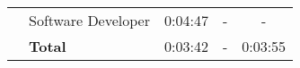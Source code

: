 \begin{table}[tb]
\begin{tabular}{llrrr}
                            & Software Developer   & 0:04:47                                                           & \multicolumn{1}{c}{-}                                                   & \multicolumn{1}{c}{-}                                         \\
                            & \textbf{Total}       & 0:03:42                                                           & \multicolumn{1}{c}{-}                                                   & 0:03:55                                                       \\ \hline
  \end{tabular}
  \end{table}


